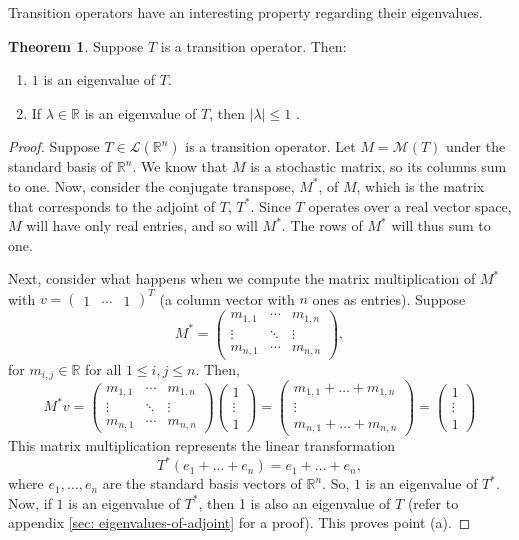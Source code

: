 \documentclass{article}
\renewcommand{\L}{\mathcal{L}}
\newcommand{\R}{\mathbb{R}}
\newcommand{\M}{\mathcal{M}}
\theoremstyle{definition}
\newtheorem{theorem}{Theorem}
\begin{document}
Transition operators have an interesting property regarding their eigenvalues.

\begin{theorem}\label{thm: transition-operator-eigenvalues}
    Suppose $T$ is a transition operator. Then:
    \begin{enumerate}[label=(\alph*)]
        \item $1$ is an eigenvalue of $T$.
        \item If $\lambda \in \R$ is an eigenvalue of $T$, then $|\lambda| \leq 1$ \cite{margalit_2019_interactive}.
    \end{enumerate} 
\end{theorem}
\begin{proof}
    Suppose $T \in \L(\R^n)$ is a transition operator. Let $M = \M(T)$ under the standard basis of $\R^n$. We know that $M$ is a stochastic matrix, so its columns sum to one. Now, consider the conjugate transpose, $M^*$, of $M$, which is the matrix that corresponds to the adjoint of $T$, $T^*$. Since $T$ operates over a real vector space, $M$ will have only real entries, and so will $M^*$. The rows of $M^*$ will thus sum to one.

    Next, consider what happens when we compute the matrix multiplication of $M^*$ with $v = \begin{pmatrix}1 & \cdots & 1\end{pmatrix}^T$ (a column vector with $n$ ones as entries). Suppose $$M^* = \begin{pmatrix}
        m_{1, 1} & \cdots & m_{1, n} \\
        \vdots & \ddots & \vdots \\
        m_{n, 1} & \cdots & m_{n, n}
    \end{pmatrix},$$ for $m_{i, j} \in \R$ for all $1 \leq i, j \leq n$. Then, $$M^*v = \begin{pmatrix}
        m_{1, 1} & \cdots & m_{1, n} \\
        \vdots & \ddots & \vdots \\
        m_{n, 1} & \cdots & m_{n, n}
    \end{pmatrix} \begin{pmatrix}
        1 \\
        \vdots \\
        1
    \end{pmatrix} = \begin{pmatrix}
        m_{1, 1} + \dots + m_{1, n} \\
        \vdots \\
        m_{n, 1} + \dots + m_{n, n}
    \end{pmatrix} =  \begin{pmatrix}
        1 \\
        \vdots \\
        1
    \end{pmatrix}$$
    This matrix multiplication represents the linear transformation $$T^*(e_1 + \dots + e_n) = e_1 + \dots + e_n,$$ where $e_1, \dots, e_n$ are the standard basis vectors of $\R^n$. So, $1$ is an eigenvalue of $T^*$. Now, if $1$ is an eigenvalue of $T^*$, then 1 is also an eigenvalue of $T$ (refer to appendix \ref{sec: eigenvalues-of-adjoint} for a proof). This proves point (a). 


\end{proof}
\end{document}

